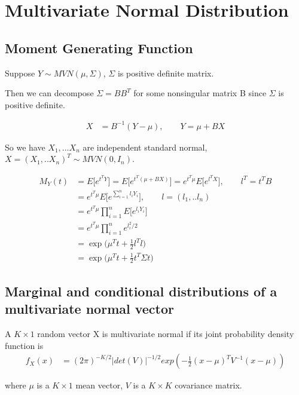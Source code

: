 
\section{Multivariate Normal Distribution}

\subsection{Moment Generating Function}

Suppose $Y \sim MVN(\mu, \Sigma)$, $\Sigma$ is positive definite matrix. 

Then we can decompose $\Sigma = B B^T$ for some nonsingular matrix B since $\Sigma$ is positive definite. 

 \begin{align*}
    X &= B^{-1} (Y- \mu), \qquad Y = \mu + B X 
\end{align*}

So we have $X_1, … X_n$ are independent standard normal, $X = (X_1,.. X_n)^T \sim MVN(0, I_n)$. 

 \begin{align*}
    M_Y(t) &=  E\Big[ e^{t^T Y}\Big ]=  E\Big[ e^{t^T (\mu + B X)}\Big ] = e^{t^T \mu} E \Big[ e^{l^T X} \Big], \qquad l^T = t^T B \\
    &= e^{t^T \mu} E \Big[ e^{\sum_{i=1}^n l_i Y_i} \Big], \qquad l= (l_1,.. l_n)\\
    &= e^{t^T \mu} \prod_{i=1}^n E \Big[ e^{ l_i Y_i} \Big] \\
    &= e^{t^T \mu} \prod_{i=1}^n e^{l_i^2/2}\\
    &= \exp \Big( \mu^T t + \frac{1}{2} l^T l \Big) \\
    &= \exp \Big( \mu^T t + \frac{1}{2} t^T \Sigma t \Big)
\end{align*}

 \subsection{Marginal and conditional distributions of a multivariate normal vector}

A $K \times 1$ random vector X is multivariate normal if its joint probability density function is 
\begin{align*}
	f_X(x) &= (2\pi)^{-K/2} |det(V)|^{-1/2} exp(-\frac{1}{2} (x-\mu)^T V^{-1}(x-\mu)) 
\end{align*}

where $\mu$ is a $K \times 1$ mean vector, $V$ is a $K \times K$ covariance matrix.

